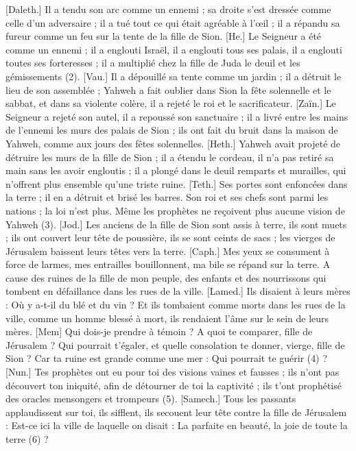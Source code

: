 \begin{multicols}{2}
[Daleth.] Il a tendu son arc comme un ennemi ; sa droite s'est dressée comme celle d’un adversaire ; il a tué tout ce qui était agréable à l’œil ; il a répandu sa fureur comme un feu sur la tente de la fille de Sion.
[He.] Le Seigneur a été comme un ennemi ; il a englouti Israël, il a englouti tous ses palais, il a englouti toutes ses forteresses ; il a multiplié chez la fille de Juda le deuil et les gémissements (2).
[Vau.] Il a dépouillé sa tente comme un jardin ; il a détruit le lieu de son assemblée ; Yahweh a fait oublier dans Sion la fête solennelle et le sabbat, et dans sa violente colère, il a rejeté le roi et le sacrificateur.
[Zaïn.] Le Seigneur a rejeté son autel, il a repoussé son sanctuaire ; il a livré entre les mains de l’ennemi les murs des palais de Sion ; ils ont fait du bruit dans la maison de Yahweh, comme aux jours des fêtes solennelles.
[Heth.] Yahweh avait projeté de détruire les murs de la fille de Sion ; il a étendu le cordeau, il n’a pas retiré sa main sans les avoir engloutis ; il a plongé dans le deuil remparts et murailles, qui n'offrent plus ensemble qu'une triste ruine.
[Teth.] Ses portes sont enfoncées dans la terre ; il en a détruit et brisé les barres. Son roi et ses chefs sont parmi les nations ; la loi n’est plus. Même les prophètes ne reçoivent plus aucune vision de Yahweh (3).
[Jod.] Les anciens de la fille de Sion sont assis à terre, ils sont muets ; ils ont couvert leur tête de poussière, ils se sont ceints de sacs ; les vierges de Jérusalem baissent leurs têtes vers la terre.
[Caph.] Mes yeux se consument à force de larmes, mes entrailles bouillonnent, ma bile se répand sur la terre. A cause des ruines de la fille de mon peuple, des enfants et des nourrissons qui tombent en défaillance dans les rues de la ville.
[Lamed.] Ils disaient à leurs mères : Où y a-t-il du blé et du vin ? Et ils tombaient comme morts dans les rues de la ville, comme un homme blessé à mort, ils rendaient l'âme sur le sein de leurs mères.
[Mem] Qui dois-je prendre à témoin ? A quoi te comparer, fille de Jérusalem ? Qui pourrait t'égaler, et quelle consolation te donner, vierge, fille de Sion ? Car ta ruine est grande comme une mer : Qui pourrait te guérir (4) ?
[Nun.] Tes prophètes ont eu pour toi des visions vaines et fausses ; ils n’ont pas découvert ton iniquité, afin de détourner de toi la captivité ; ils t’ont prophétisé des oracles mensongers et trompeurs (5).
[Samech.] Tous les passants applaudissent sur toi, ils sifflent, ils secouent leur tête contre la fille de Jérusalem : Est-ce ici la ville de laquelle on disait : La parfaite en beauté, la joie de toute la terre (6) ?

\end{multicols}
